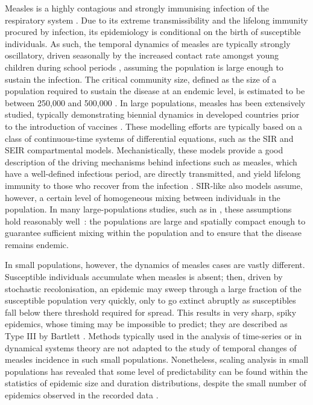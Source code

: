 \documentclass[10pt]{article}
\begin{document}
Measles is a highly contagious and strongly immunising infection of the respiratory system \cite{Anderson1991}. Due to its extreme transmissibility and the lifelong immunity procured by infection, its epidemiology is conditional on the birth of susceptible individuals. As such, the temporal dynamics of measles are typically strongly oscillatory, driven seasonally by the increased contact rate amongst young children during school periods \cite{London1973, Fine1982, Schenzle1984}, assuming the population is large enough to sustain the infection. The critical community size, defined as the size of a population required to sustain the disease at an endemic level, is estimated to be between 250,000 and 500,000 \cite{Bartlett1957, Black1966, Keeling1997}. In large populations, measles has been extensively studied, typically demonstrating biennial dynamics in developed countries prior to the introduction of vaccines \cite{Bolker1995, Grenfell1997}. These modelling efforts are typically based on a class of continuous-time systems of differential equations, such as the SIR and SEIR compartmental models. Mechanistically, these models provide a good description of the driving mechanisms behind infections such as measles, which have a well-defined infectious period, are directly transmitted, and yield lifelong immunity to those who recover from the infection \cite{Anderson1991}. SIR-like also models assume, however, a certain level of homogeneous mixing between individuals in the population. In many large-populations studies, such as in \cite{Bjornstad2002}, these assumptions hold reasonably well~: the populations are large and spatially compact enough to guarantee sufficient mixing within the population and to ensure that the disease remains endemic. 

In small populations, however, the dynamics of measles cases are vastly different. Susceptible individuals accumulate when measles is absent; then, driven by stochastic recolonisation, an epidemic may sweep through a large fraction of the susceptible population very quickly, only to go extinct abruptly as susceptibles fall below there threshold required for spread. This results in very sharp, spiky epidemics, whose timing may be impossible to predict; they are described as Type III by Bartlett \cite{Bartlett1957}. Methods typically used in the analysis of time-series or in dynamical systems theory are not adapted to the study of temporal changes of measles incidence in such small populations. Nonetheless, scaling analysis in small populations has revealed that some level of predictability can be found within the statistics of epidemic size and duration distributions, despite the small number of epidemics observed in the recorded data \cite{Rhodes1996a, Rhodes1996b}.
\end{document}
